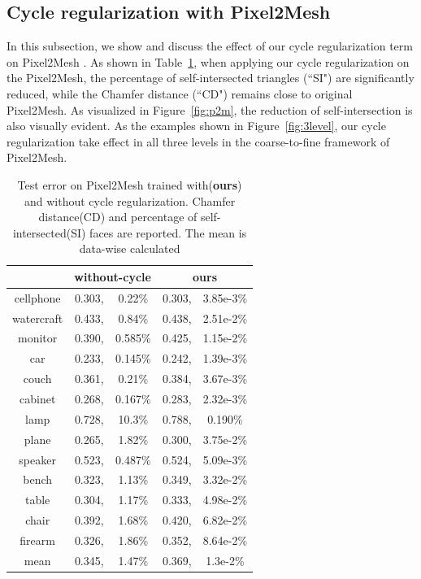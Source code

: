 \subsection{Cycle regularization with Pixel2Mesh}
In this subsection, we show and discuss the effect of our cycle regularization term on Pixel2Mesh \cite{pixel2mesh}. As shown in Table~\ref{tab:p2m}, when applying our cycle regularization on the Pixel2Mesh, the percentage of self-intersected triangles (``SI") are significantly reduced, while the Chamfer distance (``CD") remains close to original Pixel2Mesh. As visualized in Figure~\ref{fig:p2m}, the reduction of self-intersection is also visually evident. As the examples shown in Figure~\ref{fig:3level}, our cycle regularization take effect in all three levels in the coarse-to-fine framework of Pixel2Mesh.
\begin{table}
	\caption{Test error on Pixel2Mesh trained with(\textbf{ours}) and without cycle regularization. Chamfer distance(CD) and percentage of self-intersected(SI) faces are reported. The mean is data-wise calculated}
	\label{tab:p2m}
	\centering
	\begin{tabular}{c|rc|rc|}
		\diagbox{Category}{CD,SI}{Model}& \multicolumn{2}{c|}{without-cycle} & \multicolumn{2}{c|}{ours}\\
		\hline
		cellphone&0.303,&0.22\%&0.303,&3.85e-3\%\\
		watercraft&0.433,&0.84\%&0.438,&2.51e-2\%\\
		monitor&0.390,&0.585\%&0.425,&1.15e-2\%\\
		car&0.233,&0.145\%&0.242,&1.39e-3\%\\
		couch&0.361,&0.21\%&0.384,&3.67e-3\%\\
		cabinet&0.268,&0.167\%&0.283,&2.32e-3\%\\
		lamp&0.728,&10.3\%&0.788,&0.190\%\\
		plane&0.265,&1.82\%&0.300,&3.75e-2\%\\
		speaker&0.523,&0.487\%&0.524,&5.09e-3\%\\
		bench&0.323,&1.13\%&0.349,&3.32e-2\%\\
		table&0.304,&1.17\%&0.333,&4.98e-2\%\\
		chair&0.392,&1.68\%&0.420,&6.82e-2\%\\
		firearm&0.326,&1.86\%&0.352,&8.64e-2\%\\
		\hline
		mean &0.345,&1.47\%&0.369,& 1.3e-2\%\\
	\end{tabular}
\end{table}

